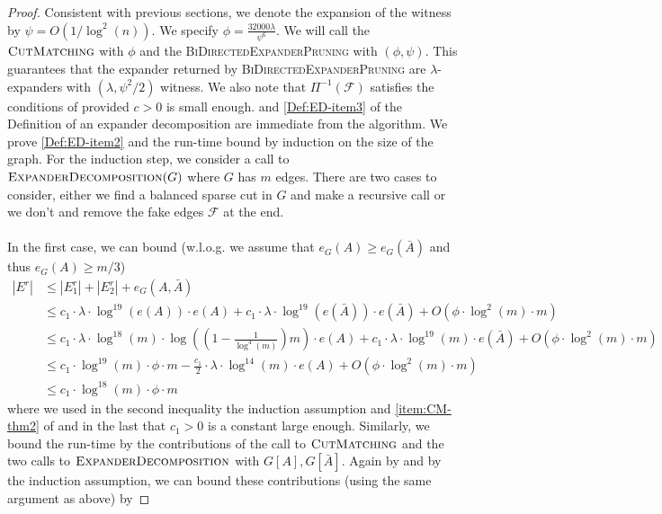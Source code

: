 \documentclass[11pt]{article}
\begin{document}
\begin{proof}
    Consistent with previous sections, we denote the expansion of the witness by $\psi = O(1/\log^2(n))$. We specify $\phi = \frac{32000 \lambda}{\psi^6}$. We will call the $\textsc{CutMatching}$ with $\phi$ and the \textsc{BiDirectedExpanderPruning} with $(\phi, \psi)$. This guarantees that the expander returned by \textsc{BiDirectedExpanderPruning} are $\lambda$-expanders with $(\lambda, \psi^2/2)$ witness. We also note that $\Pi^{-1}(\mathcal{F})$ satisfies the conditions of  provided $c > 0$ is small enough.
     and \ref{Def:ED-item3} of the Definition of an expander decomposition are immediate from the algorithm. We prove \cref{Def:ED-item2} and the run-time bound by induction on the size of the graph. For the induction step, we consider a call to $\textsc{ExpanderDecomposition}(G)$ where $G$ has $m$ edges. There are two cases to consider, either we find a balanced sparse cut in $G$ and make a recursive call or we don't and remove the fake edges $\mathcal{F}$ at the end.\\
    \\
    In the first case, we can bound (w.l.o.g. we assume that $e_G(A) \geq e_G(\bar{A})$ and thus $e_G(A) \geq m/3$)
    \begin{align*}
        |E^r| &\leq |E^r_1| + |E^r_2| + e_G(A, \bar{A}) \\
        &\leq c_1 \cdot \lambda \cdot \log^{19}(e(A)) \cdot e(A) + c_1 \cdot \lambda \cdot \log^{19}(e(\bar{A})) \cdot e(\bar{A}) + O(\phi \cdot \log^2(m) \cdot m)\\
        &\leq c_1 \cdot \lambda \cdot \log^{18}\left(m\right) \cdot \log\left(\left(1 - \frac{1}{\log^4(m)}\right)m\right) \cdot e(A) + c_1 \cdot \lambda \cdot \log^{19}(m) \cdot e(\bar{A}) + O(\phi \cdot \log^2(m) \cdot m)\\
        &\leq c_1 \cdot \log^{19}(m) \cdot \phi \cdot m - \frac{c_1}{2} \cdot \lambda \cdot \log^{14}\left(m\right) \cdot e(A) + O(\phi \cdot \log^2(m) \cdot m)\\
        &\leq c_1 \cdot \log^{18}(m) \cdot \phi \cdot m
    \end{align*}
    where we used in the second inequality the induction assumption and \cref{item:CM-thm2} of  and in the last that $c_1 > 0$ is a constant large enough. Similarly, we bound the run-time by the contributions of the call to $\textsc{CutMatching}$ and the two calls to $\textsc{ExpanderDecomposition}$ with $G[A], G[\bar{A}]$. Again by  and by the induction assumption, we can bound these contributions (using the same argument as above) by 

\end{proof}
\end{document}
